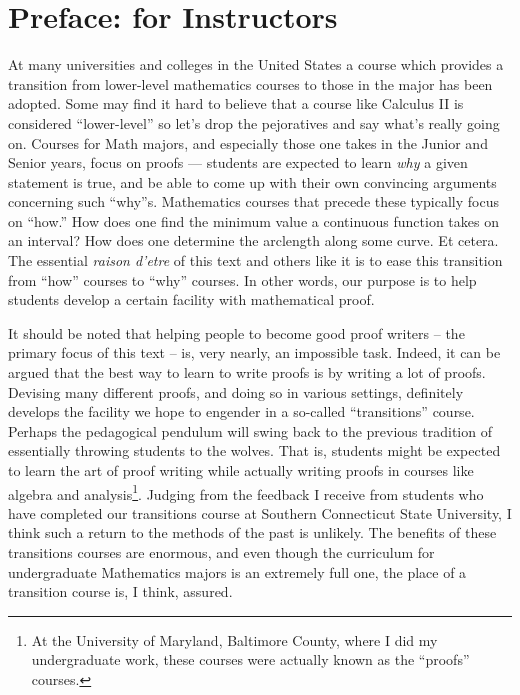 \chapter*{Preface: for Instructors}

At many universities and colleges in the United States a course which
provides a transition from lower-level mathematics courses to those in
the major has been adopted.  Some may find it hard to believe that
a course like Calculus II is considered ``lower-level'' so let's drop
the pejoratives and say what's really going on.   Courses for 
Math majors, and especially those one takes in the Junior and Senior 
years, focus on proofs --- students are expected to learn {\em why} a
given statement is true, and be able to come up with their own convincing 
arguments concerning such ``why''s.   Mathematics courses that precede 
these typically focus on ``how.''  How does one find the minimum value a
continuous function takes on an interval?  How does one determine the 
arclength along some curve.  Et cetera.  The essential {\em raison d'etre}
of this text and others like it is to ease this transition from ``how'' 
courses to ``why'' courses.  In other words, our purpose is to help 
students develop a certain facility with mathematical proof.

It should be noted that helping people to become good proof writers --
the primary focus of this text -- is, very nearly, an impossible task. 
Indeed, it can be argued that the best way to learn to write proofs
is by writing a lot of proofs.  Devising many different proofs, and
doing so in various settings, definitely develops the facility we hope
to engender in a so-called ``transitions'' course.  Perhaps the
pedagogical pendulum will swing back to the previous tradition of
essentially throwing students to the wolves.  That is, students might
be expected to learn the art of proof writing while actually writing
proofs in courses like algebra and analysis\footnote{At the University
of Maryland, Baltimore County, where I did my undergraduate work, 
these courses were actually known as the ``proofs''
courses.}.  Judging from the feedback I receive from students who have 
completed our transitions course at Southern Connecticut State
University, I think such a return to the methods of the past is
unlikely.  The benefits of these transitions courses are enormous, and
even though the curriculum for undergraduate Mathematics majors is
an extremely full one, the place of a transition course is, I think, assured.  

